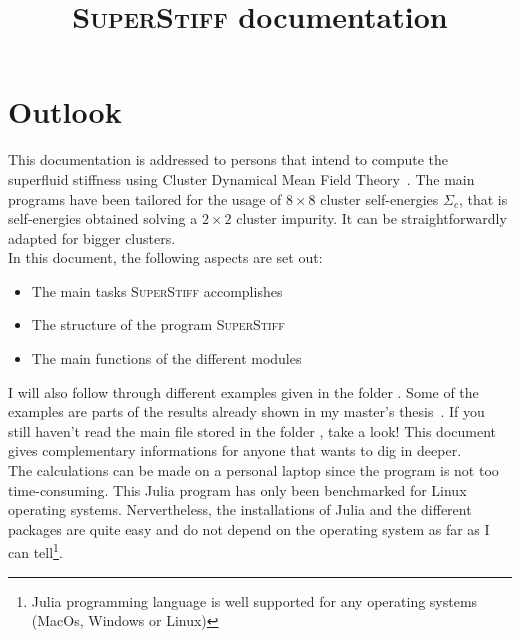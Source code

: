 \documentclass{article}
\title{
\textmd{\textsc{SuperStiff} documentation}\\
\vspace{6in}
\vspace{1cm}
}
\begin{document}

\maketitle

\newpage
\tableofcontents
\newpage


\section{Outlook}
\label{sec:outlook}

This documentation is addressed to persons that intend to compute the superfluid stiffness using Cluster Dynamical Mean Field Theory~\cite{charlebois_these}. The main programs have been tailored for the usage of $8\times 8$ cluster self-energies $\Sigma_c$, that is self-energies obtained solving a $2\times 2$ cluster impurity. It can be straightforwardly adapted for bigger clusters.\\


In this document, the following aspects are set out:
\begin{itemize}
\item The main tasks \textsc{SuperStiff} accomplishes
\item The structure of the program \textsc{SuperStiff}
\item The main functions of the different modules
\end{itemize}

I will also follow through different examples given in the folder . Some of the examples are parts of the results already shown in my master's thesis~\cite{simard_master}. If you still haven't read the main  file stored in the folder , take a look! This document gives complementary informations for anyone that wants to dig in deeper.\\

The calculations can be made on a personal laptop since the program is not too time-consuming. This Julia program has only been benchmarked for Linux operating systems. Nervertheless, the installations of Julia and the different packages are quite easy and do not depend on the operating system as far as I can tell\footnote{Julia programming language is well supported for any operating systems (MacOs, Windows or Linux)}. 
\end{document}
